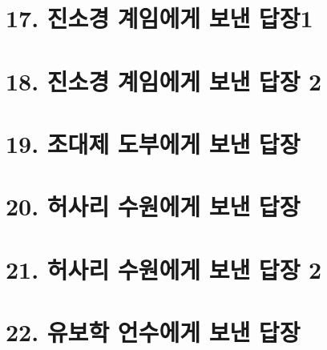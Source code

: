 \documentclass[12pt, a4paper, oneside]{book}
\let\stdsection\section
\renewcommand\section{\newpage\stdsection}
\begin{document}
%
	\section{17. 진소경 계임에게 보낸 답장1 }

%
	\section{18. 진소경 계임에게 보낸 답장 2 }

%
	\section{19. 조대제 도부에게 보낸 답장 }

%
	\section{20. 허사리 수원에게 보낸 답장 }

%
	\section{21. 허사리 수원에게 보낸 답장 2 }

%
	\section{22. 유보학 언수에게 보낸 답장 }

%
\end{document}
